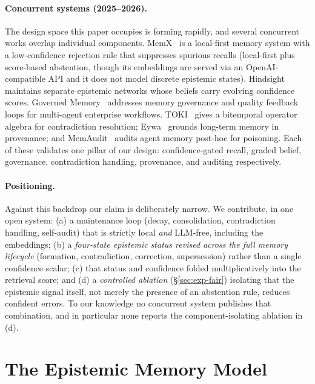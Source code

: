 \documentclass[11pt]{article}
\theoremstyle{definition}
\begin{document}
\paragraph{Concurrent systems (2025--2026).}
The design space this paper occupies is forming rapidly, and several concurrent
works overlap individual components. MemX~\cite{memx} is a local-first memory
system with a low-confidence rejection rule that suppresses spurious recalls
(local-first plus score-based abstention, though its embeddings are served via
an OpenAI-compatible API and it does not model discrete epistemic states).
Hindsight~\cite{hindsight} maintains separate epistemic networks whose beliefs
carry evolving confidence scores. Governed Memory~\cite{governed} addresses
memory governance and quality feedback loops for multi-agent enterprise
workflows. TOKI~\cite{toki} gives a bitemporal operator algebra for
contradiction resolution; Eywa~\cite{eywa} grounds long-term memory in
provenance; and MemAudit~\cite{memaudit} audits agent memory post-hoc for
poisoning. Each of these validates one pillar of our design: confidence-gated
recall, graded belief, governance, contradiction handling, provenance, and
auditing respectively.

\paragraph{Positioning.}
Against this backdrop our claim is deliberately narrow. We contribute, in one
open system: (a) a maintenance loop (decay, consolidation, contradiction
handling, self-audit) that is strictly local \emph{and} LLM-free, including the
embeddings; (b) a \emph{four-state epistemic status revised across the full
memory lifecycle} (formation, contradiction, correction, supersession) rather
than a single confidence scalar; (c) that status and confidence folded
multiplicatively into the retrieval score; and (d) a \emph{controlled ablation}
(\S\ref{sec:exp-fair}) isolating that the epistemic signal itself, not merely
the presence of an abstention rule, reduces confident errors. To our knowledge
no concurrent system publishes that combination, and in particular none reports
the component-isolating ablation in (d).

\section{The Epistemic Memory Model}\label{sec:model}
\end{document}
